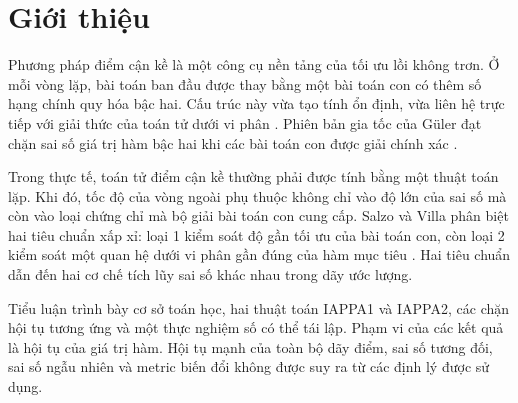 \section{Giới thiệu}

Phương pháp điểm cận kề là một công cụ nền tảng của tối ưu lồi không trơn. Ở mỗi vòng lặp, bài toán ban đầu được thay bằng một bài toán con có thêm số hạng chính quy hóa bậc hai. Cấu trúc này vừa tạo tính ổn định, vừa liên hệ trực tiếp với giải thức của toán tử dưới vi phân \cite{salzo2012,rockafellar1976,ryuyin2023}. Phiên bản gia tốc của Güler đạt chặn sai số giá trị hàm bậc hai khi các bài toán con được giải chính xác \cite{guler1992}.

Trong thực tế, toán tử điểm cận kề thường phải được tính bằng một thuật toán lặp. Khi đó, tốc độ của vòng ngoài phụ thuộc không chỉ vào độ lớn của sai số mà còn vào loại chứng chỉ mà bộ giải bài toán con cung cấp. Salzo và Villa phân biệt hai tiêu chuẩn xấp xỉ: loại 1 kiểm soát độ gần tối ưu của bài toán con, còn loại 2 kiểm soát một quan hệ dưới vi phân gần đúng của hàm mục tiêu \cite{salzo2012}. Hai tiêu chuẩn dẫn đến hai cơ chế tích lũy sai số khác nhau trong dãy ước lượng.

Tiểu luận trình bày cơ sở toán học, hai thuật toán IAPPA1 và IAPPA2, các chặn hội tụ tương ứng và một thực nghiệm số có thể tái lập. Phạm vi của các kết quả là hội tụ của giá trị hàm. Hội tụ mạnh của toàn bộ dãy điểm, sai số tương đối, sai số ngẫu nhiên và metric biến đổi không được suy ra từ các định lý được sử dụng.

